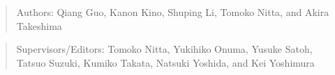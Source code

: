 \begin{quotation}
  Authors:
  Qiang Guo,
  Kanon Kino,
  Shuping Li,
  Tomoko Nitta,
  and
  Akira Takeshima
\end{quotation}
\begin{quotation}
  Supervisors/Editors:
  Tomoko Nitta,
  Yukihiko Onuma,
  Yusuke Satoh,
  Tatsuo Suzuki,
  Kumiko Takata,
  Natsuki Yoshida,
  and
  Kei Yoshimura
\end{quotation}
